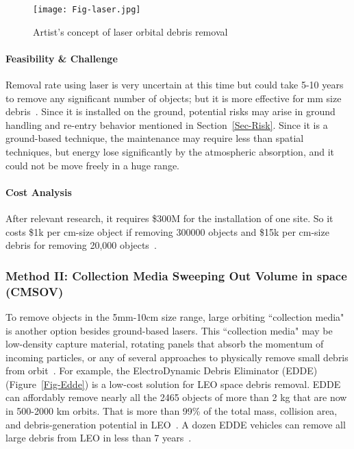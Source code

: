 \documentclass{mcmthesis}
\begin{document}
	\begin{figure}[htbp]
		\centering
		\texttt{[image: Fig-laser.jpg]}
		\caption{Artist's concept of laser orbital debris removal~\cite{Phipps}}
		\label{Fig-Laser}
	\end{figure}
	
	\paragraph{Feasibility \& Challenge}
	
	Removal rate using laser is very uncertain at this time but could take 5-10 years to remove any significant number of objects; but it is more effective for mm size debris~\cite{McKnight}. Since it is installed on the ground, potential risks may arise in ground handling and re-entry behavior mentioned in Section~\ref{Sec-Risk}. Since it is a ground-based technique, the maintenance may require less than spatial techniques, but energy lose significantly by the atmospheric absorption, and it could not be move freely in a huge range.
	
	\paragraph{Cost Analysis}
	
	After relevant research, it requires \$300M for the installation of one site. So it costs \$1k per cm-size object if removing 300000 objects and \$15k per cm-size debris for removing 20,000 objects~\cite{McKnight}.
	
	
	\subsubsection{Method II: Collection Media Sweeping Out Volume in space (CMSOV)}
	
	To remove objects in the 5mm-10cm size range, large orbiting ``collection media" is another option besides ground-based lasers. This ``collection media" may be low-density capture material, rotating panels that absorb the momentum of incoming particles, or any of several approaches to physically remove small debris from orbit~\cite{McKnight}. For example, the ElectroDynamic Debris Eliminator (EDDE) (Figure~\ref{Fig-Edde}) is a low-cost solution for LEO space debris removal. EDDE can affordably remove nearly all the 2465 objects of more than 2 kg that are now in 500-2000 km orbits. That is more than 99\% of the total mass, collision area, and debris-generation potential in LEO~\cite{Pearson2010}. A dozen EDDE vehicles can remove all large debris from LEO in less than 7 years~\cite{Pearson}.
	
\end{document}
